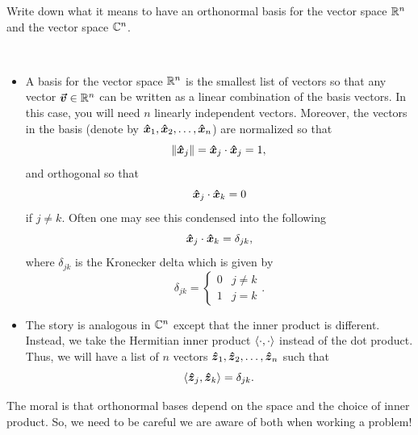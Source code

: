 \documentclass[12pt]{article} %
\begin{document}
\newpage
\begin{problem}
	Write down what it means to have an orthonormal basis for the vector space $\mathbb{R}^n$ and the vector space $\mathbb{C}^n$.
\end{problem}
\begin{solution}~
	\begin{itemize}
		\item A basis for the vector space $\mathbb{R}^n$ is the smallest list of vectors so that any vector $\boldsymbol{\vec{v}}\in \mathbb{R}^n$ can be written as a linear combination of the basis vectors. In this case, you will need $n$ linearly independent vectors. Moreover, the vectors in the basis (denote by $\boldsymbol{\hat{x}}_1,\boldsymbol{\hat{x}}_2,\dots,\boldsymbol{\hat{x}}_n$) are normalized so that
		\[
		\|\boldsymbol{\hat{x}}_j\|=\boldsymbol{\hat{x}}_j \cdot \boldsymbol{\hat{x}}_j=1,
		\]
		and orthogonal so that
		\[
		\boldsymbol{\hat{x}}_j\cdot \boldsymbol{\hat{x}}_k=0
		\]
		if $j\neq k$. Often one may see this condensed into the following
		\[
		\boldsymbol{\hat{x}}_j \cdot \boldsymbol{\hat{x}}_k = \delta_{jk},
		\]
		where $\delta_{jk}$ is the Kronecker delta which is given by
		\[
		\delta_{jk} =  \begin{cases} 0 & j\neq k \\ 1 & j=k\end{cases}.
		\]
		\item The story is analogous in $\mathbb{C}^n$ except that the inner product is different. Instead, we take the Hermitian inner product $\left\langle \cdot, \cdot \right\rangle$ instead of the dot product.  Thus, we will have a list of $n$ vectors $\boldsymbol{\hat{z}}_1,\boldsymbol{\hat{z}}_2,\dots,\boldsymbol{\hat{z}}_n$ such that
		\[
		\left\langle \boldsymbol{\hat{z}}_j, \boldsymbol{\hat{z}}_k \right\rangle = \delta_{jk}.
		\]
	\end{itemize}
	The moral is that orthonormal bases depend on the space and the choice of inner product. So, we need to be careful we are aware of both when working a problem!
\end{solution}
\end{document}
